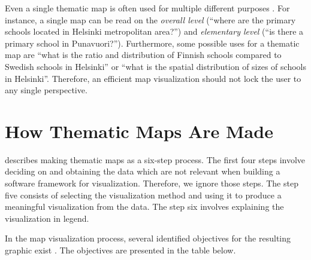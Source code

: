 Even a single thematic map is often used for multiple different purposes \citep[chap.~2]{schlichtmann_visualization_2002}. For instance, a single map can be read on the \emph{overall level} (``where are the primary schools located in Helsinki metropolitan area?'') and \emph{elementary level} (``is there a primary school in Punavuori?''). Furthermore, some possible uses for a thematic map are ``what is the ratio and distribution of Finnish schools compared to Swedish schools in Helsinki'' or ``what is the spatial distribution of sizes of schools in Helsinki''. Therefore, an efficient map visualization should not lock the user to any single perspective.  


\section{How Thematic Maps Are Made}
\citet{schlichtmann_visualization_2002} describes making thematic maps as a six-step process. The first four steps involve deciding on and obtaining the data which are not relevant when building a software framework for visualization. Therefore, we ignore those steps. The step five consists of selecting the visualization method and using it to produce a meaningful visualization from the data. The step six involves explaining the visualization in legend. 

In the map visualization process, several identified objectives for the resulting graphic exist \citep{schlichtmann_visualization_2002}. The objectives are presented in the table below.

